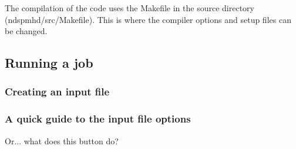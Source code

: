 \documentclass[a4paper,12pt]{article}
\begin{document}
 The compilation of the code uses the Makefile in the source directory
(ndspmhd/src/Makefile). This is where the compiler options and setup files can
be changed.

\subsection{Running a job}
\subsubsection{Creating an input file}

\subsubsection{A quick guide to the input file options}
Or... what does this button do?
\end{document}
